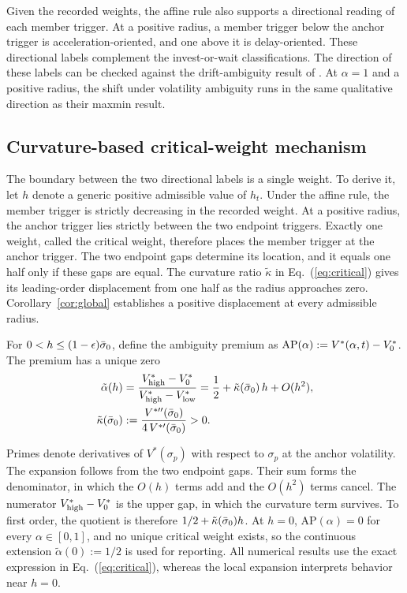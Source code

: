 Given the recorded weights, the affine rule also supports a directional reading of each member trigger. At a positive radius, a member trigger below the anchor trigger is acceleration-oriented, and one above it is delay-oriented. These directional labels complement the invest-or-wait classifications. The direction of these labels can be checked against the drift-ambiguity result of \citet{NishimuraOzaki2007}. At $\alpha=1$ and a positive radius, the shift under volatility ambiguity runs in the same qualitative direction as their maxmin result.

\subsection{Curvature-based critical-weight mechanism}

The boundary between the two directional labels is a single weight. To derive it, let $h$ denote a generic positive admissible value of $h_t$. Under the affine rule, the member trigger is strictly decreasing in the recorded weight. At a positive radius, the anchor trigger lies strictly between the two endpoint triggers. Exactly one weight, called the critical weight, therefore places the member trigger at the anchor trigger. The two endpoint gaps determine its location, and it equals one half only if these gaps are equal. The curvature ratio $\tilde{\kappa}$ in Eq.~(\ref{eq:critical}) gives its leading-order displacement from one half as the radius approaches zero. Corollary~\ref{cor:global} establishes a positive displacement at every admissible radius.

\begin{proposition}\label{prop:critical}
For $0<h\le(1-\epsilon)\bar{\sigma}_0$, define the ambiguity premium as $\mathrm{AP}(\alpha):=V^{*}(\alpha,t)-V^{*}_{0}$. The premium has a unique zero
\begin{equation}
\begin{aligned}
\tilde{\alpha}(h)&=\frac{V^{*}_{\mathrm{high}}-V^{*}_{0}}{V^{*}_{\mathrm{high}}-V^{*}_{\mathrm{low}}}=\frac{1}{2}+\tilde{\kappa}(\bar{\sigma}_0)\,h+O(h^{2}),\\
\tilde{\kappa}(\bar{\sigma}_0)&:=\frac{V^{*\prime\prime}(\bar{\sigma}_0)}{4\,V^{*\prime}(\bar{\sigma}_0)}>0.
\end{aligned}
\label{eq:critical}
\end{equation}
\end{proposition}

Primes denote derivatives of $V^{*}(\sigma_p)$ with respect to $\sigma_p$ at the anchor volatility. The expansion follows from the two endpoint gaps. Their sum forms the denominator, in which the $O(h)$ terms add and the $O(h^{2})$ terms cancel. The numerator $V^{*}_{\mathrm{high}}-V^{*}_{0}$ is the upper gap, in which the curvature term survives. To first order, the quotient is therefore $1/2+\tilde{\kappa}(\bar{\sigma}_0)h$. At $h=0$, $\mathrm{AP}(\alpha)=0$ for every $\alpha\in[0,1]$, and no unique critical weight exists, so the continuous extension $\tilde{\alpha}(0):=1/2$ is used for reporting. All numerical results use the exact expression in Eq.~(\ref{eq:critical}), whereas the local expansion interprets behavior near $h=0$.


